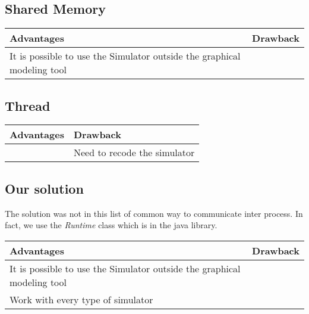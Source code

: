 \subsection{Shared Memory}

\begin{tabular}{|p{}||p{}|}
\hline
  \textbf{Advantages}&\textbf{Drawback}\\
\hline
It is possible to use the Simulator outside the graphical modeling tool & \\
\hline
\end{tabular}


\subsection{Thread}

\begin{tabular}{|p{}||p{}|}
\hline
  \textbf{Advantages}&\textbf{Drawback}\\
\hline
&Need to recode the simulator \\
\hline
\end{tabular}


\subsection{Our solution}

The solution was not in this list of common way to communicate inter process. In fact, we use the \textit{Runtime} class which is in the java library.~\\


\begin{tabular}{|p{}||p{}|}
\hline
  \textbf{Advantages}&\textbf{Drawback}\\
\hline
It is possible to use the Simulator outside the graphical modeling tool & \\
\hline
Work with every type of simulator& \\
\hline
\end{tabular}





